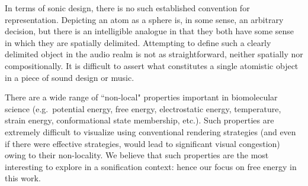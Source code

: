 \documentclass[a4paper,10pt,oneside]{article}
\begin{document}
\begin{sloppy}

  In terms of sonic design, there is no such established convention for representation. Depicting an atom as a sphere is, in some sense, an arbitrary decision, but there is an intelligible analogue in that they both have some sense in which they are spatially delimited. Attempting to define such a clearly delimited object in the audio realm is not as straightforward, neither spatially nor compositionally.  It is difficult to assert what constitutes a single atomistic object in a piece of sound design or music.%

  There are a wide range of ``non-local" properties important in biomolecular science (e.g.\ potential energy, free energy, electrostatic energy, temperature, strain energy, conformational state membership, etc.). Such properties are extremely difficult to visualize using conventional rendering strategies (and even if there were effective strategies, would lead to significant visual congestion) owing to their non-locality. We believe that such properties are the most interesting to explore in a sonification context: hence our focus on free energy in this work.


\end{sloppy}
\end{document}
